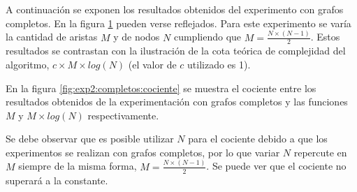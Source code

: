     \renewcommand\constante{1}

    A continuación se exponen los resultados obtenidos del experimento con grafos completos. En la figura \ref{fig:exp2:completos} pueden verse reflejados. Para este experimento se varía la cantidad de aristas $M$ y de nodos $N$ cumpliendo que $M = \frac{N \times (N - 1)}{2}$. Estos resultados se contrastan con la ilustración de la cota teórica de complejidad del algoritmo, $c \times M \times log(N)$ (el valor de $c$ utilizado es \constante).

    \begin{figure}[H]
        \centering
        \caption{}
        \label{fig:exp2:completos}
    \end{figure}

    En la figura \ref{fig:exp2:completos:cociente} se muestra el cociente entre los resultados obtenidos de la experimentación con grafos completos y las funciones $M$ y $M \times log(N)$ respectivamente. 

    Se debe observar que es posible utilizar $N$ para el cociente debido a que los experimentos se realizan con grafos completos, por lo que variar $N$ repercute en $M$ siempre de la misma forma, $M = \frac{N \times (N - 1)}{2}$. Se puede ver que el cociente no superará a la constante.

